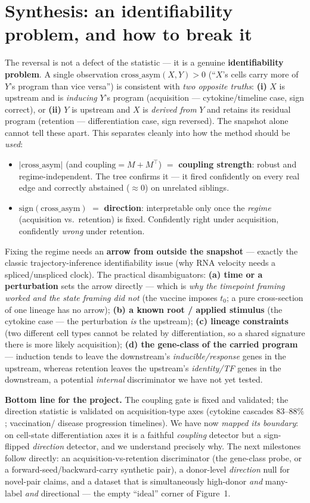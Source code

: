 \documentclass[11pt]{article}
\begin{document}
\section{Synthesis: an identifiability problem, and how to break it}
The reversal is not a defect of the statistic --- it is a genuine \textbf{identifiability problem}.
A single observation $\mathrm{cross\_asym}(X,Y)>0$ (``$X$'s cells carry more of $Y$'s program than
vice versa'') is consistent with \emph{two opposite truths}: \textbf{(i)} $X$ is upstream and is
\emph{inducing} $Y$'s program (acquisition --- cytokine/timeline case, sign correct), or
\textbf{(ii)} $Y$ is upstream and $X$ is \emph{derived from} $Y$ and retains its residual program
(retention --- differentiation case, sign reversed). The snapshot alone cannot tell these apart.
This separates cleanly into how the method should be \emph{used}:
\begin{itemize}
\item $|\mathrm{cross\_asym}|$ (and $\text{coupling}=M+M^{\top}$) $=$ \textbf{coupling strength}:
robust and regime-independent. The tree confirms it --- it fired confidently on every real edge
and correctly abstained ($\approx0$) on unrelated siblings.
\item $\mathrm{sign}(\mathrm{cross\_asym})$ $=$ \textbf{direction}: interpretable only once the
\emph{regime} (acquisition vs.\ retention) is fixed. Confidently right under acquisition,
confidently \emph{wrong} under retention.
\end{itemize}
Fixing the regime needs an \textbf{arrow from outside the snapshot} --- exactly the classic
trajectory-inference identifiability issue (why RNA velocity needs a spliced/unspliced clock). The
practical disambiguators: \textbf{(a) time or a perturbation} sets the arrow directly --- which is
\emph{why the timepoint framing worked and the state framing did not} (the vaccine imposes
$t_0$; a pure cross-section of one lineage has no arrow); \textbf{(b) a known root / applied
stimulus} (the cytokine case --- the perturbation \emph{is} the upstream); \textbf{(c) lineage
constraints} (two different cell types cannot be related by differentiation, so a shared signature
there is more likely acquisition); \textbf{(d) the gene-class of the carried program} ---
induction tends to leave the downstream's \emph{inducible/response} genes in the upstream, whereas
retention leaves the upstream's \emph{identity/TF} genes in the downstream, a potential
\emph{internal} discriminator we have not yet tested.

\textbf{Bottom line for the project.} The coupling gate is fixed and validated; the direction
statistic is validated on acquisition-type axes (cytokine cascades $83$--$88\%$; vaccination/
disease progression timelines). We have now \emph{mapped its boundary}: on cell-state
differentiation axes it is a faithful \emph{coupling} detector but a sign-flipped \emph{direction}
detector, and we understand precisely why. The next milestones follow directly: an
acquisition-vs-retention discriminator (the gene-class probe, or a forward-seed/backward-carry
synthetic pair), a donor-level \emph{direction} null for novel-pair claims, and a dataset that is
simultaneously high-donor \emph{and} many-label \emph{and} directional --- the empty ``ideal''
corner of Figure~1.
\end{document}

